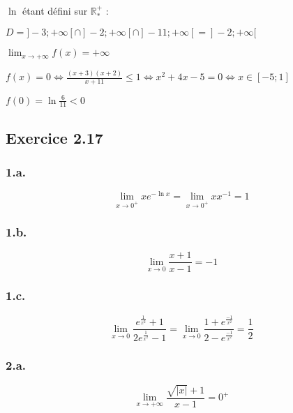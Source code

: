 \documentclass{report}
\begin{document}
$\ln$ étant défini sur $\mathbb{R}^{+}_{*}$ :

$D = ]-3 ; +\infty[ \cap ]-2 ; +\infty[ \cap ]-11 ; +\infty[ = ]-2 ; +\infty[$

$\lim_{x \rightarrow +\infty} f(x) = +\infty$

$f(x)=0 \Longleftrightarrow  \frac{(x+3)(x+2)}{x+11} \leq 1 \Longleftrightarrow x^2 +4x -5 =0 \Longleftrightarrow x \in [-5 ; 1]$

$f(0) = \ln\frac{6}{11} < 0$



\subsection*{Exercice 2.17}

\subsubsection*{1.a.}
\begin{displaymath}
	\lim_{x \rightarrow 0^{+}} x e^{-\ln x} = \lim_{x \rightarrow 0^{+}} x x^{-1} = 1
\end{displaymath}

\subsubsection*{1.b.}
\begin{displaymath}
	\lim_{x \rightarrow 0} \frac{x+1}{x-1} = -1
\end{displaymath}

\subsubsection*{1.c.}
\begin{displaymath}
		\lim_{x \rightarrow 0} \frac{e^{\frac{1}{x^2}}+1}{2e^{\frac{1}{x^2}}-1}
		        = \lim_{x \rightarrow 0} \frac{1 + e^{\frac{-1}{x^2}}}{2-e^{\frac{-1}{x^2}}} = \frac{1}{2}
\end{displaymath}

\subsubsection*{2.a.}
\begin{displaymath}
	\lim_{x \rightarrow +\infty} \frac{\sqrt{|x|}+1}{x-1} = 0^{+}
\end{displaymath}
\end{document}
